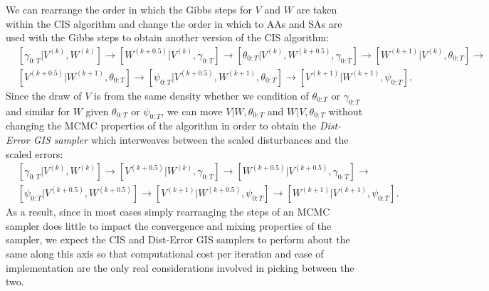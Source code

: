 \documentclass{article}
\begin{document}
We can rearrange the order in which the Gibbs steps for $V$ and $W$ are taken within the CIS algorithm and change the order in which to AAs and SAs are used with the Gibbs steps to obtain another version of the CIS algorithm:
\begin{align*}
&[\gamma_{0:T}|V^{(k)},W^{(k)}] \to [W^{(k+0.5)}|V^{(k)},\gamma_{0:T}] \to [\theta_{0:T}|V^{(k)},W^{(k+0.5)},\gamma_{0:T}] \to [W^{(k+1)}|V^{(k)},\theta_{0:T}]\to \\
&[V^{(k+0.5)}|W^{(k+1)},\theta_{0:T}] \to [\psi_{0:T}|V^{(k+0.5)},W^{(k+1)},\theta_{0:T}] \to [V^{(k+1)}|W^{(k+1)},\psi_{0:T}].
\end{align*}
Since the draw of $V$ is from the same density whether we condition of $\theta_{0:T}$ or $\gamma_{0:T}$ and similar for $W$ given $\theta_{0:T}$ or $\psi_{0:T}$, we can move $V|W,\theta_{0:T}$ and $W|V,\theta_{0:T}$ without changing the MCMC properties of the algorithm in order to obtain the {\it Dist-Error GIS sampler} which interweaves between the scaled disturbances and the scaled errors:
\begin{align*}
&[\gamma_{0:T}|V^{(k)},W^{(k)}] \to [V^{(k+0.5)}|W^{(k)},\gamma_{0:T}] \to[W^{(k+0.5)}|V^{(k+0.5)},\gamma_{0:T}] \to \\
&[\psi_{0:T}|V^{(k+0.5)},W^{(k+0.5)}]\to [V^{(k+1)}|W^{(k+0.5)},\psi_{0:T}]\to [W^{(k+1)}|V^{(k+1)},\psi_{0:T}].
\end{align*}
As a result, since in most cases simply rearranging the steps of an MCMC sampler does little to impact the convergence and mixing properties of the sampler, we expect the CIS and Dist-Error GIS samplers to perform about the same along this axis so that computational cost per iteration and ease of implementation are the only real considerations involved in picking between the two.
\end{document}
